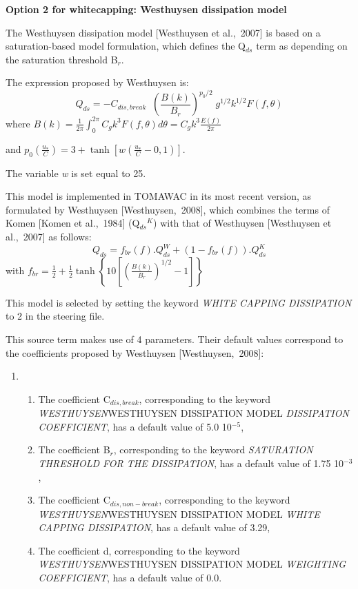 {\bf  Option 2 for whitecapping: Westhuysen dissipation model}

 The Westhuysen dissipation model [Westhuysen et al.,~2007] is based on a saturation-based model formulation, which defines the Q${}_{ds}$ term as depending on the saturation threshold B${}_{r}$.

 The expression proposed by Westhuysen is:
\begin{equation} \label{GrindEQ__4_40_}
Q_{ds} =-C_{dis,break} \; \; \left(\frac{B(k)}{B_{r} } \right)^{p_{0} /2} \; g^{1/2} k^{1/2} F(f,\theta )
\end{equation}
where $B(k)=\frac{1}{2\pi } \int _{0}^{2\pi }C_{g} k^{3} F(f,\theta )d\theta  =C_{g} k^{3} \frac{E(f)}{2\pi } $

 and $p_{0} \left(\frac{u_{*} }{C} \right)=3+\tanh \left[w\left(\frac{u_{*} }{C} -0,1\right)\right]$.

 The variable \textit{w} is set equal to 25.

 This model is implemented in TOMAWAC in its most recent version, as formulated by Westhuysen [Westhuysen,~2008], which combines the terms of Komen [Komen et al.,~1984] (Q${}_{ds}$${}^{K}$) with that of Westhuysen [Westhuysen et al.,~2007] as follows:
\begin{equation} \label{GrindEQ__4_41_}
Q_{ds} =f_{br} (f).Q_{ds} ^{W} +\left(1-f_{br} (f)\right).Q_{ds} ^{K}
\end{equation}
with $f_{br} =\frac{1}{2} +\frac{1}{2} \tanh \left\{10\left[\left(\frac{B(k)}{B_{r} } \right)^{1/2} -1\right]\right\}$

 This model is selected by setting the keyword \textit{WHITE CAPPING DISSIPATION} to 2 in the steering file.\textbf{}

 This source term makes use of 4 parameters. Their default values correspond to the coefficients proposed by Westhuysen [Westhuysen,~2008]:

\begin{enumerate}
\item \begin{enumerate}
\item  The coefficient C${}_{dis,break}$, corresponding to the keyword \textit{WESTHUYSEN}WESTHUYSEN DISSIPATION MODEL\textit{ DISSIPATION COEFFICIENT}, has a default value of 5.0 10${}^{-5}$,

\item  The coefficient B${}_{r}$, corresponding to the keyword \textit{SATURATION THRESHOLD FOR THE DISSIPATION}, has a default value of 1.75 10${}^{-3}$,

\item  The coefficient C${}_{dis,non-break}$, corresponding to the keyword \textit{WESTHUYSEN}WESTHUYSEN DISSIPATION MODEL\textit{ WHITE CAPPING DISSIPATION}, has a default value of 3.29,

\item  The coefficient d, corresponding to the keyword \textit{WESTHUYSEN}WESTHUYSEN DISSIPATION MODEL\textit{ WEIGHTING COEFFICIENT}, has a default value of 0.0.
\end{enumerate}
\end{enumerate}




